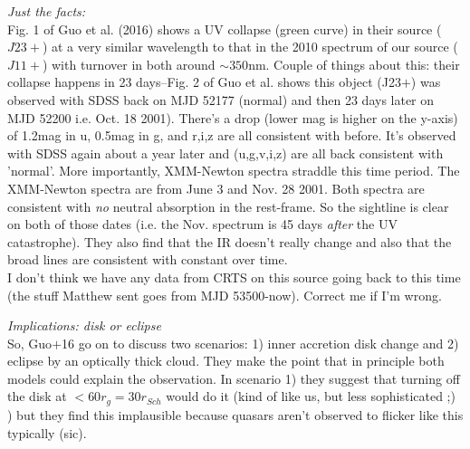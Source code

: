 \documentclass[12pt]{article}
\begin{document}
\emph{Just the facts:}\\
Fig. 1 of Guo et al. (2016) shows a UV collapse (green curve) in their source ($J23+$) at a very similar wavelength to that in the 2010 spectrum of our source ($J11+$) with turnover in both around $\sim 350$nm. Couple of things about this: their collapse happens in 23 days--Fig. 2 of Guo et al. shows this object (J23$+$) was observed with SDSS back on MJD 52177 (normal) and then 23 days later on MJD 52200 i.e. Oct. 18 2001). There's a drop (lower mag is higher on the y-axis) of 1.2mag in u, 0.5mag in g, and r,i,z are all consistent with before. It's observed with SDSS again about a year later and (u,g,v,i,z) are all back consistent with 'normal'. More importantly, XMM-Newton spectra straddle this time period. The XMM-Newton spectra are from June 3 and Nov. 28 2001. Both spectra are consistent with \emph{no} neutral absorption in the rest-frame. So the sightline is clear on both of those dates (i.e. the Nov. spectrum is 45 days \emph{after} the UV catastrophe). They also find that the IR doesn't really change and also that the broad lines are consistent with constant over time.\\

I don't think we have any data from CRTS on this source going back to this time (the stuff Matthew sent goes from MJD 53500-now). Correct me if I'm wrong.

\emph{Implications: disk or eclipse}\\
So, Guo$+$16 go on to discuss two scenarios: 1) inner accretion disk change and 2) eclipse by an optically thick cloud. They make the point that in principle both models could explain the observation. In scenario 1) they suggest that turning off the disk at $<60r_{g}=30r_{Sch}$ would do it (kind of like us, but less sophisticated ;) ) but they find this implausible because quasars aren't observed to flicker like this typically (sic). \\
\end{document}
